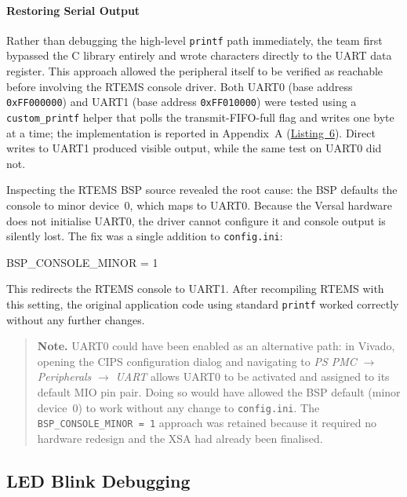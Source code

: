 \documentclass[
	a4paper,
]{CSMakotoTechnicalReport}
\begin{document}
\paragraph*{Restoring Serial Output}

Rather than debugging the high-level \texttt{printf} path immediately, the team first bypassed the C library entirely and wrote characters directly to the UART data register.
This approach allowed the peripheral itself to be verified as reachable before involving the RTEMS console driver.
Both UART0 (base address \texttt{0xFF000000}) and UART1 (base address \texttt{0xFF010000}) were tested using a \texttt{custom\_printf} helper that polls the transmit-FIFO-full flag and writes one byte at a time; the implementation is reported in Appendix~A (\hyperref[lst:6]{Listing~6}).
Direct writes to UART1 produced visible output, while the same test on UART0 did not.

Inspecting the RTEMS BSP source revealed the root cause: the BSP defaults the console to minor device~0, which maps to UART0.
Because the Versal hardware does not initialise UART0, the driver cannot configure it and console output is silently lost.
The fix was a single addition to \texttt{config.ini}:

\begin{bashcode}
BSP_CONSOLE_MINOR = 1
\end{bashcode}

This redirects the RTEMS console to UART1.
After recompiling RTEMS with this setting, the original application code using standard \texttt{printf} worked correctly without any further changes.

\begin{quote}
\textbf{Note.}
UART0 could have been enabled as an alternative path: in Vivado, opening the CIPS configuration dialog and navigating to \textit{PS PMC} $\to$ \textit{Peripherals} $\to$ \textit{UART} allows UART0 to be activated and assigned to its default MIO pin pair.
Doing so would have allowed the BSP default (minor device~0) to work without any change to \texttt{config.ini}.
The \texttt{BSP\_CONSOLE\_MINOR = 1} approach was retained because it required no hardware redesign and the XSA had already been finalised.
\end{quote}


\subsection{LED Blink Debugging}
\label{sec:process-led}
\end{document}
